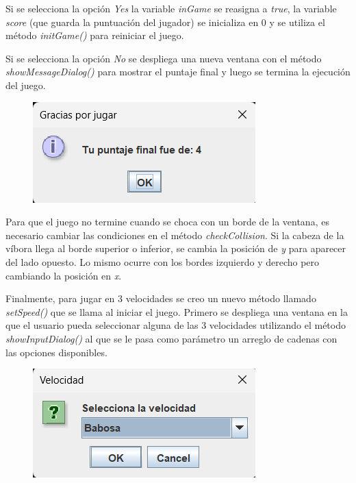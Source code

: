 \documentclass[11pt, twocolumn]{article}
\begin{document}
  Si se selecciona la opción \textit{Yes} la variable \textit{inGame} se reasigna a \textit{true}, la variable \textit{score} (que guarda la puntuación del jugador) se inicializa en 0 y se utiliza el método \textit{initGame()} para reiniciar el juego.

  Si se selecciona la opción \textit{No} se despliega una nueva ventana con el método \textit{showMessageDialog()} para mostrar el puntaje final y luego se termina la ejecución del juego.

  \begin{figure}[ht]
    \includegraphics[width=0.75\columnwidth, center]{v2.png}
  \end{figure}  

  Para que el juego no termine cuando se choca con un borde de la ventana, es necesario cambiar las condiciones en el método \textit{checkCollision}. Si la cabeza de la víbora llega al borde superior o inferior, se cambia la posición de \textit{y} para aparecer del lado opuesto. Lo mismo ocurre con los bordes izquierdo y derecho pero cambiando la posición en \textit{x}.

  Finalmente, para jugar en 3 velocidades se creo un nuevo método llamado \textit{setSpeed()} que se llama al iniciar el juego. Primero se despliega una ventana en la que el usuario pueda seleccionar alguna de las 3 velocidades utilizando el método \textit{showInputDialog()} al que se le pasa como parámetro un arreglo de cadenas con las opciones disponibles.

  \begin{figure}[ht]
    \includegraphics[width=0.75\columnwidth, center]{v3.png}
  \end{figure}
  
\end{document}
